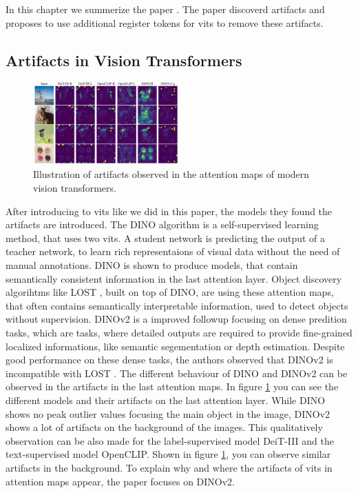 \documentclass[conference]{IEEEtran}
\begin{document}
  In this chapter we summerize the paper \cite{registers}. The paper discoverd artifacts and proposes to use additional register tokens for \acp{vit} to remove these artifacts.

  \subsection{Artifacts in Vision Transformers}

  \begin{figure}
    \centering
    \includegraphics[width=0.5\textwidth]{figures/vits-artifacts.png}
    \caption{Illustration of artifacts observed in the attention maps of modern vision transformers. \cite{registers}}
    \label{fig:artifacts-observations}
  \end{figure}


  After introducing to \acp{vit} like we did in this paper, the models they found the artifacts are introduced. The DINO algorithm is a self-supervised learning method, that uses two \acp{vit}. A student network is predicting the output of a teacher network, to learn rich representaions of visual data without the need of manual annotations. \cite{dino} DINO is shown to produce models, that contain semantically consistent information in the last attention layer. Object discovery algorihtms like LOST \cite{lost}, built on top of DINO, are using these attention maps, that often contains semantically interpretable information, used to detect objects without supervision. DINOv2 \cite{dinov2} is a improved followup focusing on dense predition tasks, which are tasks, where detailed outputs are required to provide fine-grained localized informations, like semantic segementation or depth estimation. Despite good performance on these dense tasks, the authors observed that DINOv2 is incompatible with LOST \cite{registers}. The different behaviour of DINO and DINOv2 can be observed in the artifacts in the last attention maps. In figure \ref{fig:artifacts-observations} you can see the different models and their artifacts on the last attention layer.
  While DINO shows no peak outlier values focusing the main object in the image, DINOv2 shows a lot of artifacts on the background of the images. This qualitatively observation can be also made for the label-supervised model DeiT-III and the text-supervised model OpenCLIP. Shown in figure \ref{fig:artifacts-observations}, you can observe similar artifacts in the background.
  To explain why and where the artifacts of \acp{vit} in attention maps appear, the paper focuses on DINOv2. 
\end{document}
